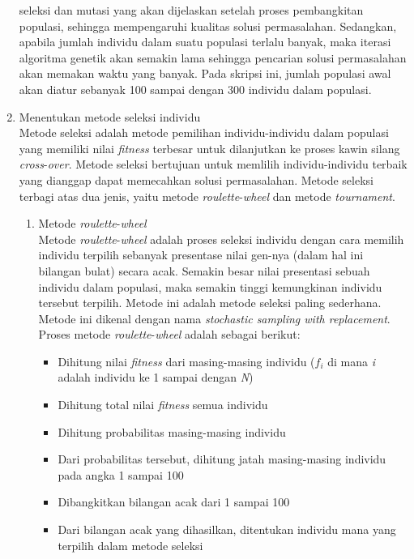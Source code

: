 \begin{enumerate}[1.]
	seleksi dan mutasi yang akan dijelaskan setelah proses pembangkitan populasi, sehingga mempengaruhi kualitas solusi permasalahan. Sedangkan, apabila jumlah individu dalam suatu populasi terlalu banyak, 	maka iterasi algoritma genetik akan semakin lama sehingga
	pencarian solusi permasalahan akan memakan waktu yang banyak. Pada skripsi ini, jumlah populasi awal akan diatur sebanyak 100 sampai dengan 300 individu dalam populasi.
	\\
	\item Menentukan metode seleksi individu
	\\
	Metode seleksi adalah metode pemilihan individu-individu dalam populasi yang memiliki nilai \textit{fitness} terbesar untuk dilanjutkan ke proses kawin silang \textit{cross}-\textit{over}. Metode seleksi bertujuan untuk memlilih individu-individu terbaik yang dianggap 			dapat memecahkan solusi permasalahan. Metode seleksi terbagi atas dua jenis, yaitu metode \textit{roulette}-\textit{wheel} dan metode \textit{tournament}.

	\begin{enumerate}

		\item Metode \textit{roulette}-\textit{wheel}
		\\
		Metode \textit{roulette}-\textit{wheel} adalah proses seleksi individu dengan cara memilih individu terpilih sebanyak presentase nilai gen-nya (dalam hal ini bilangan bulat) secara acak. Semakin besar nilai presentasi sebuah individu dalam populasi, maka semakin
		tinggi kemungkinan individu tersebut terpilih. Metode ini adalah metode seleksi paling sederhana. Metode ini dikenal dengan nama \textit{stochastic sampling with replacement}. Proses metode \textit{roulette}-\textit{wheel} adalah sebagai berikut:
		\begin{itemize}

			\item Dihitung nilai \textit{fitness} dari masing-masing individu (\begin{math} f_i \end{math} di mana \textit{i} adalah individu ke 1 sampai dengan \textit{N})
			\item Dihitung total nilai \textit{fitness} semua individu
			\item Dihitung probabilitas masing-masing individu
			\item Dari probabilitas tersebut, dihitung jatah masing-masing individu pada angka 1 sampai 100
			\item Dibangkitkan bilangan acak dari 1 sampai 100
			\item Dari bilangan acak yang dihasilkan, ditentukan individu mana yang terpilih dalam metode seleksi


\end{itemize}
\end{enumerate}
\end{enumerate}
